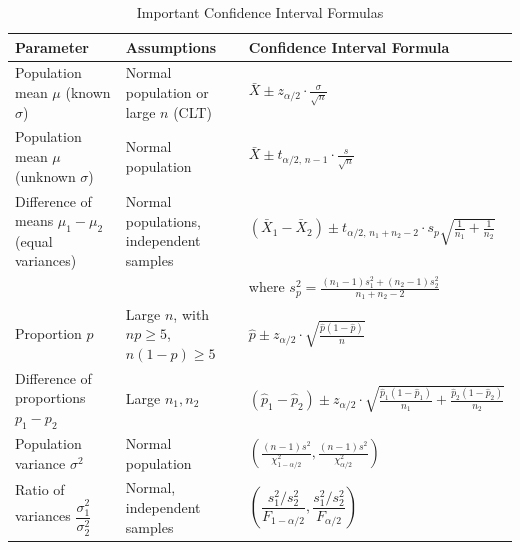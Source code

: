 \documentclass[twoside]{book}
\begin{document}


\begin{table}
	\centering
	\caption{Important Confidence Interval Formulas}
	\begin{tabular}{@{}lll@{}}
		\toprule
		\textbf{Parameter} & \textbf{Assumptions} & \textbf{Confidence Interval Formula} \\ \midrule

		Population mean $\mu$ (known $\sigma$) &
		Normal population or large $n$ (CLT) &
		$\displaystyle \bar{X} \pm z_{\alpha/2} \cdot \frac{\sigma}{\sqrt{n}}$ \\[10pt]

		Population mean $\mu$ (unknown $\sigma$) &
		Normal population &
		$\displaystyle \bar{X} \pm t_{\alpha/2,\,n-1} \cdot \frac{s}{\sqrt{n}}$ \\[10pt]

		Difference of means $\mu_1 - \mu_2$ (equal variances) &
		Normal populations, independent samples &
		$\displaystyle (\bar{X}_1 - \bar{X}_2) \pm t_{\alpha/2,\,n_1+n_2-2} \cdot s_p \sqrt{\frac{1}{n_1} + \frac{1}{n_2}}$ \\
		& & where $\displaystyle s_p^2 = \frac{(n_1-1)s_1^2 + (n_2-1)s_2^2}{n_1 + n_2 - 2}$ \\[10pt]

		Proportion $p$ &
		Large $n$, with $np \ge 5$, $n(1-p) \ge 5$ &
		$\displaystyle \hat{p} \pm z_{\alpha/2} \cdot \sqrt{\frac{\hat{p}(1 - \hat{p})}{n}}$ \\[10pt]

		Difference of proportions $p_1 - p_2$ &
		Large $n_1, n_2$ &
		$\displaystyle (\hat{p}_1 - \hat{p}_2) \pm z_{\alpha/2} \cdot \sqrt{ \frac{\hat{p}_1(1 - \hat{p}_1)}{n_1} + \frac{\hat{p}_2(1 - \hat{p}_2)}{n_2} }$ \\[10pt]

		Population variance $\sigma^2$ &
		Normal population &
		$\displaystyle \left( \frac{(n-1)s^2}{\chi^2_{1-\alpha/2}}, \frac{(n-1)s^2}{\chi^2_{\alpha/2}} \right)$ \\[10pt]

		Ratio of variances $\dfrac{\sigma_1^2}{\sigma_2^2}$ &
		Normal, independent samples &
		$\displaystyle \left( \dfrac{s_1^2 / s_2^2}{F_{1-\alpha/2}}, \dfrac{s_1^2 / s_2^2}{F_{\alpha/2}} \right)$ \\

		\bottomrule
	\end{tabular}
	\label{tab:ci_sideways}
\end{table}
\end{document}

